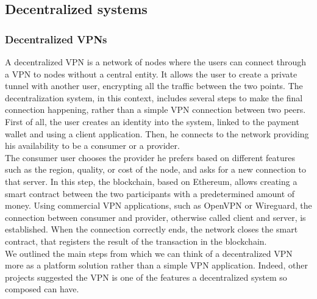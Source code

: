 \documentclass[12pt]{article}
\begin{document}
	\subsection{Decentralized systems}

	\subsubsection{Decentralized VPNs}

	A decentralized VPN is a network of nodes where the users can connect through a VPN to nodes without a central entity. It allows the user to create a private tunnel with another user, encrypting all the traffic between the two points. 
	The decentralization system, in this context, includes several steps to make the final connection happening, rather than a simple VPN connection between two peers.\\
	First of all, the user creates an identity into the system, linked to the payment wallet and using a client application. Then, he connects to the network providing his availability to be a consumer or a provider.\\
	The consumer user chooses the provider he prefers based on different features such as the region, quality, or cost of the node, and asks for a new connection to that server. In this step, the blockchain, based on Ethereum, allows creating a smart contract between the two participants with a predetermined amount of money. Using commercial VPN applications, such as OpenVPN or Wireguard, the connection between consumer and provider, otherwise called client and server, is established. When the connection correctly ends, the network closes the smart contract, that registers the result of the transaction in the blockchain.\\
	We outlined the main steps from which we can think of a decentralized VPN more as a platform solution rather than a simple VPN application. Indeed, other projects suggested the VPN is one of the features a decentralized system so composed can have.
		          
\end{document}
